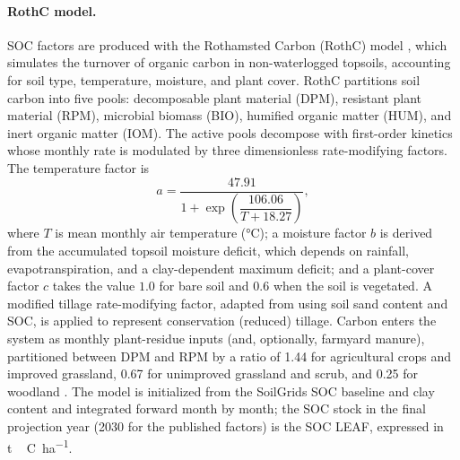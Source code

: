 \documentclass[11pt]{article}
\begin{document}
\paragraph{RothC model.} SOC factors are produced with the Rothamsted Carbon (RothC)
model \citep{coleman2024}, which simulates the turnover of organic carbon in
non-waterlogged topsoils, accounting for soil type, temperature, moisture, and plant
cover. RothC partitions soil carbon into five pools: decomposable plant material (DPM),
resistant plant material (RPM), microbial biomass (BIO), humified organic matter (HUM),
and inert organic matter (IOM). The active pools decompose with first-order kinetics
whose monthly rate is modulated by three dimensionless rate-modifying factors. The
temperature factor is
\begin{equation}
a = \frac{47.91}{1 + \exp\!\left(\dfrac{106.06}{T + 18.27}\right)},
\label{eq:rmf-temp}
\end{equation}
where $T$ is mean monthly air temperature (\si{\degreeCelsius}); a moisture factor $b$
is derived from the accumulated topsoil moisture deficit, which depends on rainfall,
evapotranspiration, and a clay-dependent maximum deficit; and a plant-cover factor $c$
takes the value $1.0$ for bare soil and $0.6$ when the soil is vegetated. A modified
tillage rate-modifying factor, adapted from \citet{hyun2024} using soil sand content and
SOC, is applied to represent conservation (reduced) tillage. Carbon enters the system as
monthly plant-residue inputs (and, optionally, farmyard manure), partitioned between DPM
and RPM by a ratio of 1.44 for agricultural crops and improved grassland, 0.67 for
unimproved grassland and scrub, and 0.25 for woodland \citep{coleman2024}. The model is
initialized from the SoilGrids SOC baseline and clay content and integrated forward
month by month; the SOC stock in the final projection year (2030 for the published
factors) is the SOC LEAF, expressed in \si{\tonne\,C\per\hectare}.
\end{document}
